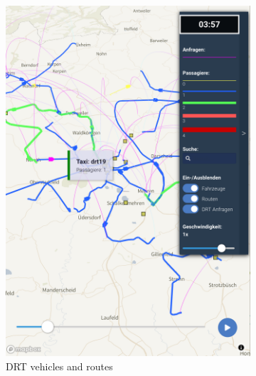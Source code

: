 \documentclass[3p,times,procedia]{elsarticle}
\begin{document}
\begin{figure}[ht]
\centering
\begin{subfigure}[c]{0.4\textwidth}
   \includegraphics[width=\linewidth]{images/fig-drt-vehicles.png}
   \caption{DRT vehicles and routes}
   \label{fig:vehicles}
\end{subfigure}
\begin{subfigure}[c]{0.4\textwidth}

\end{subfigure}
\end{figure}
\end{document}
